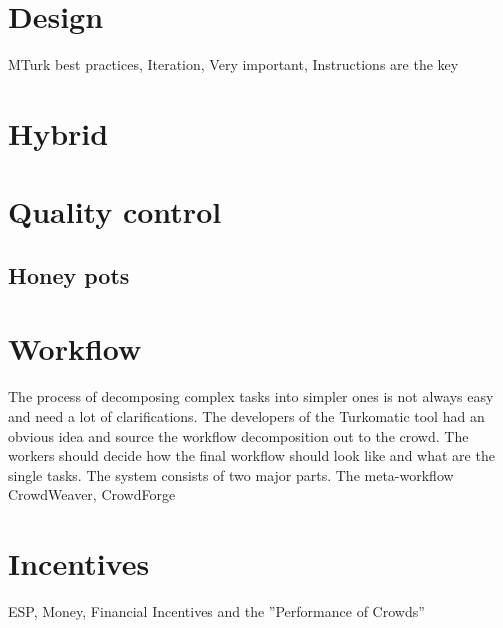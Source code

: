 \section{Design}
MTurk best practices, Iteration, Very important, Instructions are the key

\section{Hybrid}

\section{Quality control}

\subsection{Honey pots}

\section{Workflow}
The process of decomposing complex tasks into simpler ones is not always easy and need a lot of clarifications. The developers of the Turkomatic tool had an obvious idea and source the workflow decomposition out to the crowd. The workers should decide how the final workflow should look like and what are the single tasks. The system consists of two major parts. The meta-workflow
CrowdWeaver, CrowdForge

\section{Incentives}
ESP, Money, Financial Incentives and the ''Performance of Crowds''

